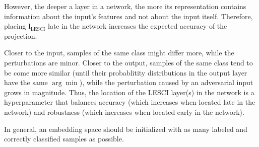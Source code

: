 \documentclass{article}
\begin{document}
However, the deeper a layer in a network, the more its representation contains information about the input's features and not about the input itself.
Therefore, placing $\bm{l}_\text{LESCI}$ late in the network increases the expected accuracy of the projection. 

Closer to the input, samples of the same class might differ more, while the perturbations are minor.
Closer to the output, samples of the same class tend to be come more similar (until their probablitity distributions in the output layer have the same $\arg\min$), while the perturbation caused by an adversarial input grows in magnitude.
Thus, the location of the LESCI layer(s) in the network is a hyperparameter that balances accuracy (which increases when located late in the network) and robustness (which increases when located early in the network).

In general, an embedding space should be initialized with as many labeled and correctly classified samples as possible.


\end{document}
